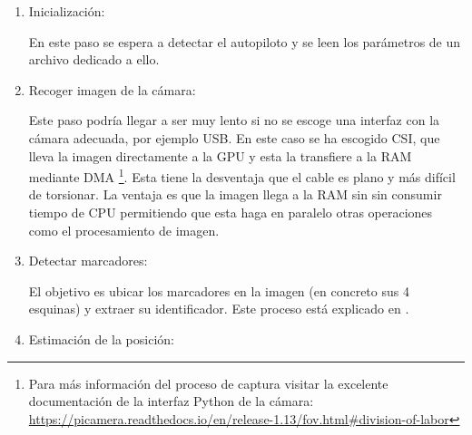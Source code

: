 \begin{enumerate}
\item Inicialización:

	En este paso se espera a detectar el autopiloto y se leen los parámetros de un archivo dedicado a ello.

\item Recoger imagen de la cámara: 

	Este paso podría llegar a ser muy lento si no se escoge una interfaz con la cámara adecuada, por ejemplo USB. En este caso se ha escogido CSI, que lleva la imagen directamente a la GPU y esta la transfiere a la RAM mediante DMA \footnote{Para más información del proceso de captura visitar la excelente documentación de la interfaz Python de la cámara: \url{https://picamera.readthedocs.io/en/release-1.13/fov.html\#division-of-labor}}. Esta tiene la desventaja que el cable es plano y más difícil de torsionar. La ventaja es que la imagen llega a la RAM sin sin consumir tiempo de CPU permitiendo que esta haga en paralelo otras operaciones como el procesamiento de imagen.

\item Detectar marcadores: 

	El objetivo es ubicar los marcadores en la imagen (en concreto sus 4 esquinas) y extraer su identificador.  Este proceso está explicado en \cite{aruco2014}. 

\item Estimación de la posición:


\end{enumerate}
